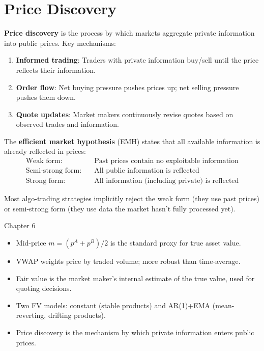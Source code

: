 \documentclass[12pt,a4paper,openany]{report}
\theoremstyle{definition}
\begin{document}
\section{Price Discovery}

\textbf{Price discovery} is the process by which markets aggregate private information into public prices. Key mechanisms:

\begin{enumerate}[label=\arabic*.]
  \item \textbf{Informed trading}: Traders with private information buy/sell until the price reflects their information.
  \item \textbf{Order flow}: Net buying pressure pushes prices up; net selling pressure pushes them down.
  \item \textbf{Quote updates}: Market makers continuously revise quotes based on observed trades and information.
\end{enumerate}

The \textbf{efficient market hypothesis} (EMH) states that all available information is already reflected in prices:
\begin{align}
  \text{Weak form:} \quad & \text{Past prices contain no exploitable information} \\
  \text{Semi-strong form:} \quad & \text{All public information is reflected} \\
  \text{Strong form:} \quad & \text{All information (including private) is reflected}
\end{align}

Most algo-trading strategies implicitly reject the weak form (they use past prices) or semi-strong form (they use data the market hasn't fully processed yet).

\begin{takeawaybox}{Chapter 6}
\begin{itemize}
  \item Mid-price $m = (p^A + p^B)/2$ is the standard proxy for true asset value.
  \item VWAP weights price by traded volume; more robust than time-average.
  \item Fair value is the market maker's internal estimate of the true value, used for quoting decisions.
  \item Two FV models: constant (stable products) and AR(1)+EMA (mean-reverting, drifting products).
  \item Price discovery is the mechanism by which private information enters public prices.
\end{itemize}
\end{takeawaybox}
\end{document}
